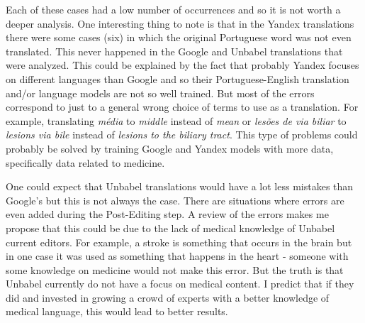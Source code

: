 Each of these cases had a low number of occurrences and so it is not worth a deeper analysis. One interesting thing to note is that in the Yandex translations there were some cases (six) in which the original Portuguese word was not even translated. This never happened in the Google and Unbabel translations that were analyzed. This could be explained by the fact that probably Yandex focuses on different languages than Google and so their Portuguese-English translation and/or language models are not so well trained. But most of the errors correspond to just to a general wrong choice of terms to use as a translation. For example, translating \textit{média} to \textit{middle} instead of \textit{mean} or \textit{lesões de via biliar} to \textit{lesions via bile} instead of \textit{lesions to the biliary tract}. This type of problems could probably be solved by training Google and Yandex models with more data, specifically data related to medicine.

One could expect that Unbabel translations would have a lot less mistakes than Google's but this is not always the case. There are situations where errors are even added during the Post-Editing step. A review of the errors makes me propose that this could be due to the lack of medical knowledge of Unbabel current editors. For example, a stroke is something that occurs in the brain but in one case it was used as something that happens in the heart - someone with some knowledge on medicine would not make this error. But the truth is that Unbabel currently do not have a focus on medical content. I predict that if they did and invested in growing a crowd of experts with a better knowledge of medical language, this would lead to better results.


  
